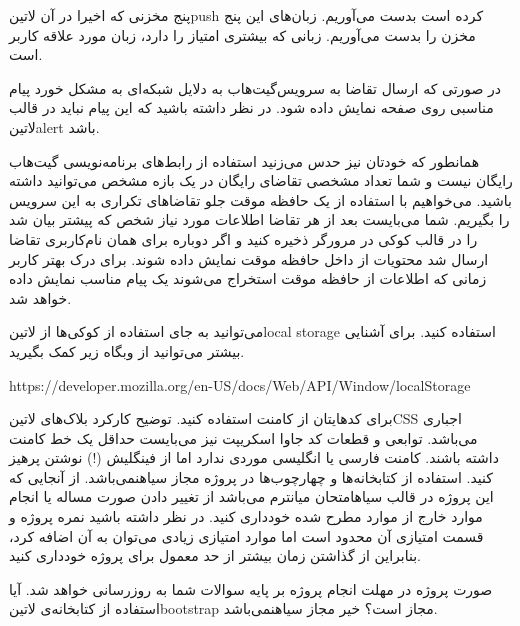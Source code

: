 \documentclass[../main.tex]{subfiles}
\begin{document}
 پنج مخزنی که اخیرا در آن ‌لاتین{push} کرده است بدست می‌آوریم.
 زبان‌های این پنج مخزن را بدست می‌آوریم.
 زبانی که بیشتری امتیاز را دارد، زبان مورد علاقه کاربر است.

در صورتی که ارسال تقاضا به سرویس‌گیت‌هاب به دلایل شبکه‌ای به مشکل خورد پیام مناسبی روی صفحه نمایش داده شود.
در نظر داشته باشید که این پیام نباید در قالب ‌لاتین{alert} باشد.

همانطور که خودتان نیز حدس می‌زنید استفاده از رابط‌های برنامه‌نویسی گیت‌هاب رایگان نیست و شما تعداد مشخصی تقاضای رایگان در یک بازه مشخص می‌توانید داشته
باشید. می‌خواهیم با استفاده از یک حافظه موقت جلو تقاضاهای تکراری به این سرویس را بگیریم. شما می‌بایست بعد از هر تقاضا اطلاعات مورد نیاز شخص که پیشتر
بیان شد را در قالب کوکی در مرورگر ذخیره کنید و اگر دوباره برای همان نام‌کاربری تقاضا ارسال شد محتویات از داخل حافظه موقت نمایش داده شوند.
برای درک بهتر کاربر زمانی که اطلاعات از حافظه موقت استخراج می‌شوند یک پیام مناسب نمایش داده خواهد شد.

می‌توانید به جای استفاده از کوکی‌ها از ‌لاتین{local storage} استفاده کنید. برای آشنایی بیشتر می‌توانید از وبگاه زیر کمک بگیرید.


\begin{latin}\begin{center}
https://developer.mozilla.org/en-US/docs/Web/API/Window/localStorage
\end{center}\end{latin}



     برای کدهایتان از کامنت استفاده کنید. توضیح کارکرد بلاک‌های ‌لاتین{CSS} اجباری می‌باشد. توابعی و قطعات کد جاوا اسکریپت نیز می‌بایست حداقل یک خط کامنت داشته باشند.
     کامنت فارسی یا انگلیسی موردی ندارد اما از فینگلیش (!) نوشتن پرهیز کنید.
     استفاده از کتابخانه‌ها و چهارچوب‌ها در پروژه مجاز ‌سیاه{نمی‌باشد}.
     از آنجایی که این پروژه در قالب ‌سیاه{امتحان میانترم} می‌باشد از تغییر دادن صورت مساله یا انجام موارد خارج از موارد مطرح شده خودداری کنید.
     در نظر داشته باشید نمره پروژه و قسمت امتیازی آن محدود است اما موارد امتیازی زیادی می‌توان به آن اضافه کرد، بنابراین از گذاشتن زمان بیشتر از حد معمول برای پروژه خودداری کنید.


صورت پروژه در مهلت انجام پروژه بر پایه سوالات شما به روزرسانی خواهد شد.
 آیا استفاده از کتابخانه‌ی ‌لاتین{bootstrap} مجاز است؟
 خیر مجاز ‌سیاه{نمی‌باشد}.
\end{document}
